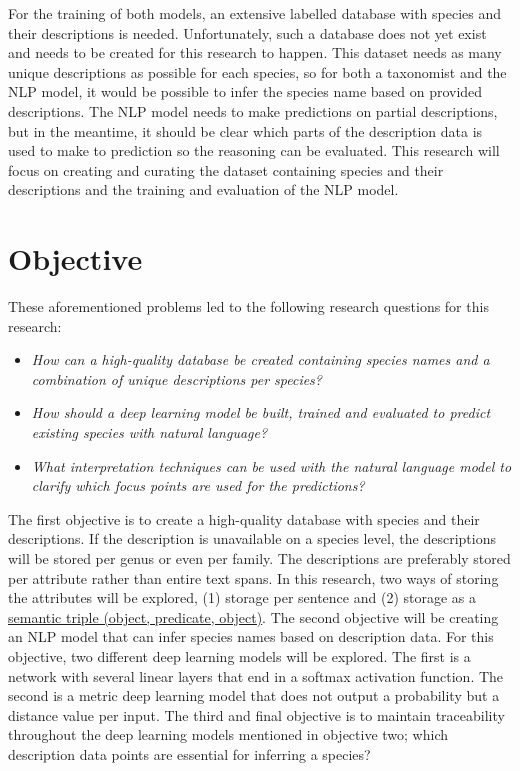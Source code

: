 \documentclass[a4paper, 12pt, oneside]{book} %
\begin{document}
For the training of both models, an extensive labelled database with species and their descriptions is needed. 
Unfortunately, such a database does not yet exist and needs to be created for this research to happen.
This dataset needs as many unique descriptions as possible for each species, so for both a taxonomist and the NLP model, it would be possible to infer the species name based on provided descriptions.
The NLP model needs to make predictions on partial descriptions, but in the meantime, it should be clear which parts of the description data is used to make to prediction so the reasoning can be evaluated.
This research will focus on creating and curating the dataset containing species and their descriptions and the training and evaluation of the NLP model.

\newpage
\section{Objective}
These aforementioned problems led to the following research questions for this research:
\noindent 
\begin{itemize}
    
    \item \emph{How can a high-quality database be created containing species names and a combination of unique descriptions per species?}
    
    \item \emph{How should a deep learning model be built, trained and evaluated to predict existing species with natural language?}

    \item \emph{What interpretation techniques can be used with the natural language model to clarify which focus points are used for the predictions?}

\end{itemize}

The first objective is to create a high-quality database with species and their descriptions.
If the description is unavailable on a species level, the descriptions will be stored per genus or even per family.
The descriptions are preferably stored per attribute rather than entire text spans.
In this research, two ways of storing the attributes will be explored, (1) storage per sentence and (2) storage as a \href{https://www.ontotext.com/knowledgehub/fundamentals/what-is-a-knowledge-graph/}{semantic triple (object, predicate, object)}.
The second objective will be creating an NLP model that can infer species names based on description data. 
For this objective, two different deep learning models will be explored.
The first is a network with several linear layers that end in a softmax activation function.
The second is a metric deep learning model that does not output a probability but a distance value per input.
The third and final objective is to maintain traceability throughout the deep learning models mentioned in objective two; which description data points are essential for inferring a species?
\end{document}
